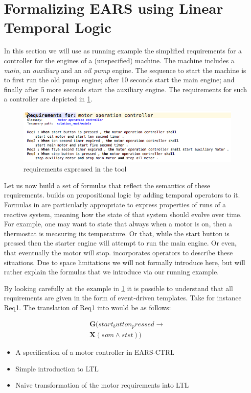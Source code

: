 \section{Formalizing EARS using Linear Temporal Logic}

In this section we will use as running example the simplified requirements for
a controller for the engines of a (unspecified) machine. The machine includes a
\emph{main}, an \emph{auxiliary} and an \emph{oil pump} engine. The sequence to
start the machine is to first run the old pump engine; after 10 seconds start
the main engine; and finally after 5 more seconds start the auxiliary engine.
The \ears requirements for such a controller are depicted in
\fig\ref{fig:reqs_motor}.

\begin{figure}[!h]
\centering
\includegraphics[width=.5\textwidth]{figures/motor_ears}
\caption{\ears requirements expressed in the \earsctrl tool}
\label{fig:reqs_motor}
\end{figure}

Let us now build a set of \ltl formulas that reflect the semantics of these
requirements. \ltl builds on propositional logic by adding temporal operators to
it. Formulas in \ltl are particularly appropriate to express properties of
runs of a reactive system, meaning how the state of that system should evolve
over time. For example, one may want to state that always when a motor is on,
then a thermostat is measuring its temperature. Or that, while the start button
is pressed then the starter engine will attempt to run the main engine. Or
even, that eventually the motor will stop. \ltl incorporates operators to
describe these situations. Due to space limitations we will not
formally introduce \ltl here, but will rather explain the formulas that we
introduce via our running example.

By looking carefully at the example in \fig\ref{fig:reqs_motor} it is possible
to understand that all requirements are given in the form of \ears event-driven
templates. Take for instance Req1. The translation of Req1 into \ltl would be as
follows:

\begin{multline}
\mathbf{G}(start_button_pressed \rightarrow\\ \textbf{X}(som\land
stst))
\end{multline}



\begin{itemize}
  \item A specification of a motor controller in EARS-CTRL
  \item Simple introduction to LTL
  \item Naive transformation of the motor requirements into LTL
\end{itemize}